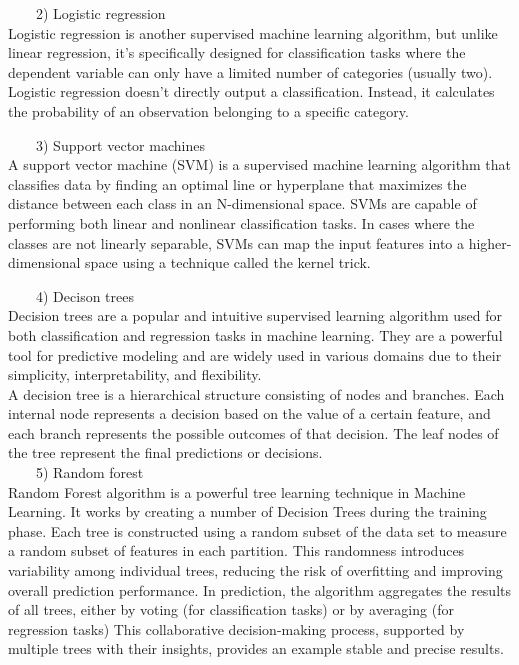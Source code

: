 \documentclass[
]{book}
\begin{document}
~~~~2) Logistic regression\\
Logistic regression is another supervised machine learning algorithm, but unlike linear regression, it's specifically designed for classification tasks where the dependent variable can only have a limited number of categories (usually two).\\
Logistic regression doesn't directly output a classification. Instead, it calculates the probability of an observation belonging to a specific category.

~~~~3) Support vector machines\\
A support vector machine (SVM) is a supervised machine learning algorithm that classifies data by finding an optimal line or hyperplane that maximizes the distance between each class in an N-dimensional space.
SVMs are capable of performing both linear and nonlinear classification tasks. In cases where the classes are not linearly separable, SVMs can map the input features into a higher-dimensional space using a technique called the kernel trick.

~~~~4) Decison trees\\
Decision trees are a popular and intuitive supervised learning algorithm used for both classification and regression tasks in machine learning. They are a powerful tool for predictive modeling and are widely used in various domains due to their simplicity, interpretability, and flexibility.\\
A decision tree is a hierarchical structure consisting of nodes and branches. Each internal node represents a decision based on the value of a certain feature, and each branch represents the possible outcomes of that decision. The leaf nodes of the tree represent the final predictions or decisions.\\

~~~~5) Random forest\\

Random Forest algorithm is a powerful tree learning technique in Machine Learning. It works by creating a number of Decision Trees during the training phase. Each tree is constructed using a random subset of the data set to measure a random subset of features in each partition. This randomness introduces variability among individual trees, reducing the risk of overfitting and improving overall prediction performance. In prediction, the algorithm aggregates the results of all trees, either by voting (for classification tasks) or by averaging (for regression tasks) This collaborative decision-making process, supported by multiple trees with their insights, provides an example stable and precise results.
\end{document}
